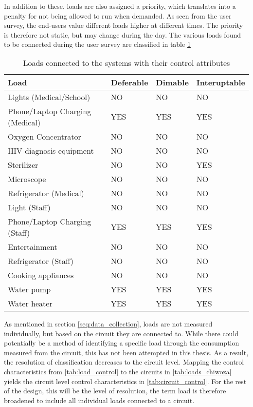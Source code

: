 In addition to these, loads are also assigned a priority, which translates into a penalty for not being allowed to run when demanded. As seen from the user survey, the end-users value different loads higher at different times. The priority is therefore not static, but may change during the day. The various loads found to be connected during the user survey are classified in table \ref{tab:load_control} \\

\begin{table}[]
    \centering
    \small
    \begin{tabular}{|>{\raggedright\arraybackslash}p{4cm}|p{1.5cm}|p{1.5cm}|p{2cm}|}
         Load & Deferable & Dimable & Interuptable \\
         \hline
         Lights (Medical/School) & NO & NO & NO\\
         Phone/Laptop Charging (Medical) & YES & YES & YES\\
         Oxygen Concentrator & NO & NO & NO\\
         HIV diagnosis equipment & NO & NO & NO\\
         Sterilizer & NO & NO & YES\\
         Microscope & NO & NO & NO\\
         Refrigerator (Medical) & NO & NO & NO\\
         \hline
         Light (Staff) & NO & NO & NO\\
         Phone/Laptop Charging (Staff) & YES & YES & YES\\
         Entertainment & NO & NO & NO\\
         Refrigerator (Staff) & NO & NO & NO\\                  
         Cooking appliances & NO & NO & NO\\
         \hline
         Water pump & YES & YES & YES\\
         Water heater & YES & YES & YES\\
         \hline
    \end{tabular}
    \caption[Connected loads control attributes]{Loads connected to the systems with their control attributes}
    \label{tab:load_control}
\end{table}

As mentioned in section \ref{seq:data_collection}, loads are not measured individually, but based on the circuit they are connected to. While there could potentially be a method of identifying a specific load through the consumption measured from the circuit, this has not been attempted in this thesis. As a result, the resolution of classification decreases to the circuit level. Mapping the control characteristics from \autoref{tab:load_control} to the circuits in \autoref{tab:loads_chiwoza} yields the circuit level control characteristics in \autoref{tab:circuit_control}. For the rest of the design, this will be the level of resolution, the term load is therefore broadened to include all individual loads connected to a circuit. 

